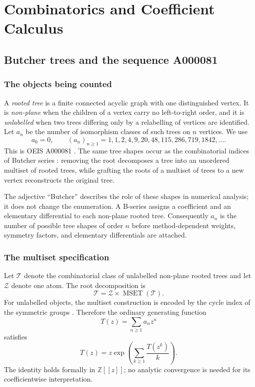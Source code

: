 \documentclass[11pt,a4paper,oneside,openany]{book}
\theoremstyle{definition}
\theoremstyle{remark}
\newcommand{\Tree}{\mathcal T}
\begin{document}
\part{Combinatorics and Coefficient Calculus}

\chapter{Butcher trees and the sequence A000081}
\label{ch:butcher}

\section{The objects being counted}
A \emph{rooted tree} is a finite connected acyclic graph with one distinguished
vertex.  It is \emph{non-plane} when the children of a vertex carry no left-to-right
order, and it is \emph{unlabelled} when two trees differing only by a relabelling of
vertices are identified.  Let $a_n$ be the number of isomorphism classes of such
trees on $n$ vertices.  We use
\[
 a_0=0,
 \qquad
 (a_n)_{n\ge1}=1,1,2,4,9,20,48,115,286,719,1842,\ldots .
\]
This is OEIS A000081 \cite{OEISA000081,Otter1948}.  The same tree shapes occur as the combinatorial indices of
Butcher series \cite{Butcher1963,Butcher1972,Butcher2021,McLachlan2017}: removing the root decomposes a tree into an unordered multiset of
rooted trees, while grafting the roots of a multiset of trees to a new vertex
reconstructs the original tree.

The adjective ``Butcher'' describes the role of these shapes in numerical analysis;
it does not change the enumeration.  A B-series assigns a coefficient and an
elementary differential to each non-plane rooted tree.  Consequently $a_n$ is the
number of possible tree shapes of order $n$ before method-dependent weights,
symmetry factors, and elementary differentials are attached.

\section{The multiset specification}
Let $\Tree$ denote the combinatorial class of unlabelled non-plane rooted trees and
let $\mathcal Z$ denote one atom.  The root decomposition is
\begin{equation}
 \Tree=\mathcal Z\times\operatorname{MSET}(\Tree).
 \label{eq:species}
\end{equation}
For unlabelled objects, the multiset construction is encoded by the cycle index of
the symmetric groups \cite{Polya1937,BergeronLabelleLeroux1998}.  Therefore the ordinary generating function
\begin{equation}
 T(z)=\sum_{n\ge1}a_nz^n
 \label{eq:Tdef}
\end{equation}
satisfies
\begin{equation}
 \boxed{
 T(z)=z\exp\!\left(\sum_{k\ge1}\frac{T(z^k)}{k}\right).}
 \label{eq:polya-functional}
\end{equation}
The identity holds formally in $\mathbb Z[[z]]$; no analytic convergence is needed
for its coefficientwise interpretation.
\end{document}
